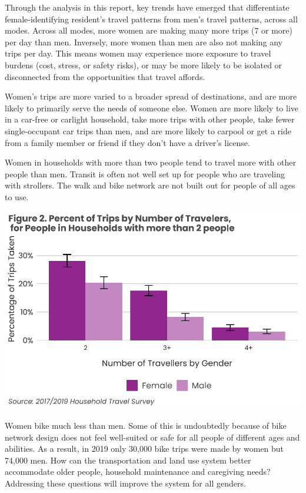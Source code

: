 \documentclass[
  12pt,
]{article}
\begin{document}
\begin{flushleft}
Through the analysis in this report, key trends have emerged that differentiate female-identifying resident’s travel patterns from men’s travel patterns, across all modes. Across all modes, more women are making many more trips (7 or more) per day than men. Inversely, more women than men are also not making any trips per day. This means women may experience more exposure to travel burdens (cost, stress, or safety risks), or may be more likely to be isolated or disconnected from the opportunities that travel affords.

Women’s trips are more varied to a broader spread of destinations, and are more likely to primarily serve the needs of someone else. Women are more likely to live in a car-free or carlight household, take more trips with other people, take fewer single-occupant car trips than men, and are more likely to carpool or get a ride from a family member or friend if they don’t have a driver’s license. 

\begin{flushleft}
Women in households with more than two people tend to travel more with other people than men. Transit is often not well set up for people who are traveling with strollers. The walk and bike network are not built out for people of all ages to use.
\end{flushleft}

\includegraphics{womens_history_story_draft_files/figure-latex/Trips by Number of Travellers-1.pdf}

\begin{flushleft}
Women bike much less than men. Some of this is undoubtedly because of bike network design does not feel well-suited or safe for all people of different ages and abilities. As a result, in 2019 only 30,000 bike trips were made by women but 74,000 men. How can the transportation and land use system better accommodate older people, household maintenance and caregiving needs? Addressing these questions will improve the system for all genders.
\end{flushleft}


\end{flushleft}
\end{document}
